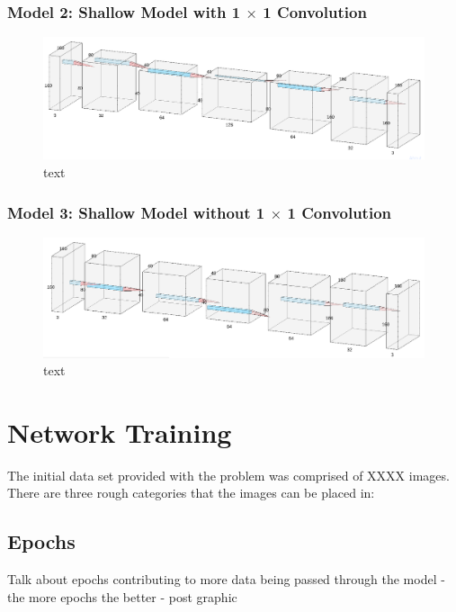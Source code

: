\documentclass[a4paper]{article}
\begin{document}
\subsubsection{Model 2: Shallow Model with 1 $\times$ 1 Convolution}
\begin{figure}
\centering
\includegraphics[scale=0.35]{model_2(2_paper)}
\caption{text}
\end{figure}

\subsubsection{Model 3: Shallow Model without 1 $\times$ 1 Convolution}
\begin{figure}
\centering
\includegraphics[scale=0.35]{model_1(3_paper)}
\caption{text}
\end{figure}

\section{Network Training}
The initial data set provided with the problem was comprised of XXXX images. There are three rough categories that the images can be placed in:



\subsection{Epochs}
Talk about epochs contributing to more data being passed through the model - the more epochs the better - post graphic
\end{document}
